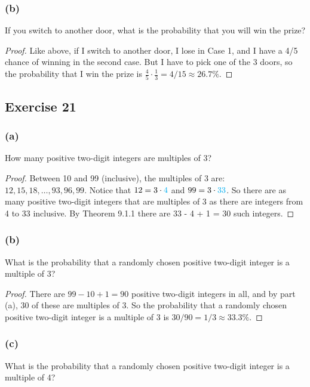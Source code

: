 \documentclass[14pt]{extarticle}
\newcommand{\cy}{\color{cyan}}
\begin{document}
\subsubsection{(b)}
If you switch to another door, what is the probability that you will win the prize?

\begin{proof}
     Like above, if I switch to another door, I lose in Case 1, and I have a 4/5 chance of winning in the second case. But I have
     to pick one of the 3 doors, so the probability that I win the prize is \(\frac{4}{5} \cdot \frac{1}{3} = 4/15 \approx 26.7\%\).
\end{proof}

\subsection{Exercise 21}
\subsubsection{(a)}
How many positive two-digit integers are multiples of 3?

\begin{proof}
     Between 10 and 99 (inclusive), the multiples of 3 are: \(12, 15, 18, \ldots, 93, 96, 99\). Notice that
     \(12 = 3 \cdot {\cy 4}\) and \(99 = 3 \cdot {\cy 33}\). So there are as many positive two-digit integers that are
     multiples of 3 as there are integers from 4 to 33 inclusive. By Theorem 9.1.1 there are 33 - 4 + 1 = 30 such
     integers.
\end{proof}

\subsubsection{(b)}
What is the probability that a randomly chosen positive two-digit integer is a multiple of 3?

\begin{proof}
     There are \(99 - 10 + 1 = 90\) positive two-digit integers in all, and by part (a), 30 of these are multiples of 3. So
     the probability that a randomly chosen positive two-digit integer is a multiple of 3 is \(30/90=1/3 \approx 33.3\%\).
\end{proof}

\subsubsection{(c)}
What is the probability that a randomly chosen positive two-digit integer is a multiple of 4?
\end{document}
